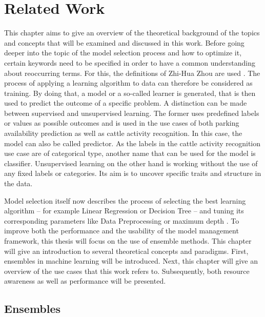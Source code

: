 \chapter{Related Work} \label{chap:relatedwork}

This chapter aims to give an overview of the theoretical background of the topics and concepts that will be examined and discussed in this work. Before going deeper into the topic of the model selection process and how to optimize it, certain keywords need to be specified in order to have a common understanding about reoccurring terms. For this, the definitions of Zhi-Hua Zhou are used \cite{zhou2012}. The process of applying a learning algorithm to data can therefore be considered as training. By doing that, a model or a so-called learner is generated, that is then used to predict the outcome of a specific problem. A distinction can be made between supervised and unsupervised learning. The former uses predefined labels or values as possible outcomes and is used in the use cases of both parking availability prediction as well as cattle activity recognition. In this case, the model can also be called predictor. As the labels in the cattle activity recognition use case are of categorical type, another name that can be used for the model is classifier. Unsupervised learning on the other hand is working without the use of any fixed labels or categories. Its aim is to uncover specific traits and structure in the data.

Model selection itself now describes the process of selecting the best learning algorithm – for example Linear Regression or Decision Tree – and tuning its corresponding parameters like Data Preprocessing or maximum depth \cite{zhou2012}. To improve both the performance and the usability of the model management framework, this thesis will focus on the use of ensemble methods. This chapter will give an introduction to several theoretical concepts and paradigms. First, ensembles in machine learning will be introduced. Next, this chapter will give an overview of the use cases that this work refers to. Subsequently, both resource awareness as well as performance will be presented.


\section{Ensembles}


